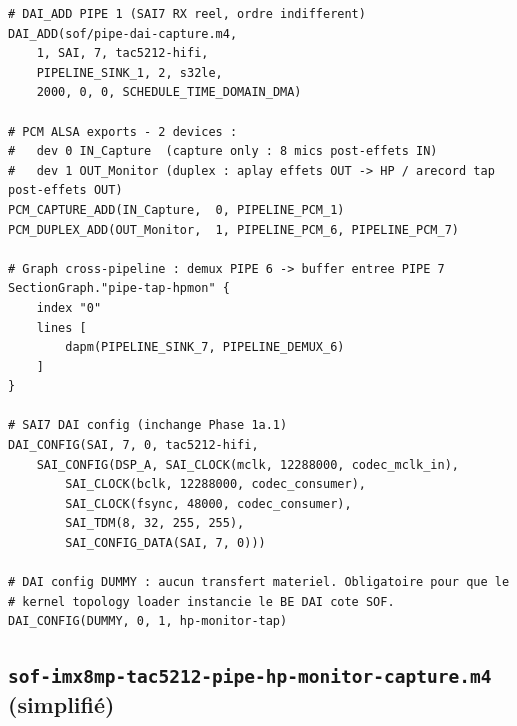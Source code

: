 \documentclass[11pt,a4paper]{article}
\begin{document}
\begin{lstlisting}[language={}, basicstyle=\ttfamily\scriptsize]
# DAI_ADD PIPE 1 (SAI7 RX reel, ordre indifferent)
DAI_ADD(sof/pipe-dai-capture.m4,
    1, SAI, 7, tac5212-hifi,
    PIPELINE_SINK_1, 2, s32le,
    2000, 0, 0, SCHEDULE_TIME_DOMAIN_DMA)

# PCM ALSA exports - 2 devices :
#   dev 0 IN_Capture  (capture only : 8 mics post-effets IN)
#   dev 1 OUT_Monitor (duplex : aplay effets OUT -> HP / arecord tap post-effets OUT)
PCM_CAPTURE_ADD(IN_Capture,  0, PIPELINE_PCM_1)
PCM_DUPLEX_ADD(OUT_Monitor,  1, PIPELINE_PCM_6, PIPELINE_PCM_7)

# Graph cross-pipeline : demux PIPE 6 -> buffer entree PIPE 7
SectionGraph."pipe-tap-hpmon" {
    index "0"
    lines [
        dapm(PIPELINE_SINK_7, PIPELINE_DEMUX_6)
    ]
}

# SAI7 DAI config (inchange Phase 1a.1)
DAI_CONFIG(SAI, 7, 0, tac5212-hifi,
    SAI_CONFIG(DSP_A, SAI_CLOCK(mclk, 12288000, codec_mclk_in),
        SAI_CLOCK(bclk, 12288000, codec_consumer),
        SAI_CLOCK(fsync, 48000, codec_consumer),
        SAI_TDM(8, 32, 255, 255),
        SAI_CONFIG_DATA(SAI, 7, 0)))

# DAI config DUMMY : aucun transfert materiel. Obligatoire pour que le
# kernel topology loader instancie le BE DAI cote SOF.
DAI_CONFIG(DUMMY, 0, 1, hp-monitor-tap)
\end{lstlisting}

\subsection{\texttt{sof-imx8mp-tac5212-pipe-hp-monitor-capture.m4} (simplifié)}
\end{document}
